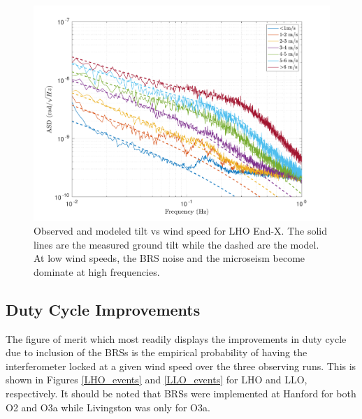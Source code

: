 \documentclass [12pt, proquest]{uwthesis}[2019]
\begin{document}
\begin{figure}[!h]
\begin{center}
\includegraphics[width=\textwidth]{TiltModel.pdf}
\caption{Observed and modeled tilt vs wind speed for LHO End-X. The solid lines are the measured ground tilt while the dashed are the model. At low wind speeds, the BRS noise and the microseism become dominate at high frequencies.}
\label{tiltModel}
\end{center}
\end{figure}

\subsection{Duty Cycle Improvements}

The figure of merit which most readily displays the improvements in duty cycle due to inclusion of the BRSs is the empirical probability of having the interferometer locked at a given wind speed over the three observing runs. This is shown in Figures \ref{LHO_events} and \ref{LLO_events} for LHO and LLO, respectively. It should be noted that BRSs were implemented at Hanford for both O2 and O3a while Livingston was only for O3a.
\end{document}
